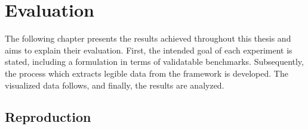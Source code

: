 \chapter{Evaluation}
\label{ch:evaluation}
The following chapter presents the results achieved throughout this thesis and aims to explain their evaluation. First, the intended goal of each experiment is stated, including a  formulation in terms of validatable benchmarks. Subsequently, the process which extracts legible data from the framework is developed. The visualized data follows, and finally, the results are analyzed.

\section{Reproduction}
